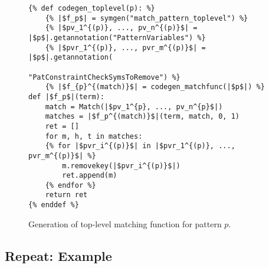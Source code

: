 \begin{figure}
\begin{verbatim}
{% def codegen_toplevel(p): %}
	{% |$f_p$| = symgen("match_pattern_toplevel") %}
	{% |$pv_1^{(p)}, ..., pv_n^{(p)}$| = |$p$|.getannotation("PatternVariables") %}
	{% |$pvr_1^{(p)}, ..., pvr_m^{(p)}$| = |$p$|.getannotation(
							           "PatConstraintCheckSymsToRemove") %}
	{% |$f_{p}^{(match)}$| = codegen_matchfunc(|$p$|) %}
def |$f_p$|(term):
	match = Match(|$pv_1^{p}, ..., pv_n^{p}$|)
	matches = |$f_p^{(match)}$|(term, match, 0, 1)
	ret = []
	for m, h, t in matches:
	{% for |$pvr_i^{(p)}$| in |$pvr_1^{(p)}, ..., pvr_m^{(p)}$| %}
		m.removekey(|$pvr_i^{(p)}$|)
		ret.append(m)
	{% endfor %}
	return ret
{% enddef %}
\end{verbatim}
\caption{Generation of top-level matching function for pattern $p$.}
\label{pat-toplevel}
\end{figure}

\subsection{Repeat: Example}

